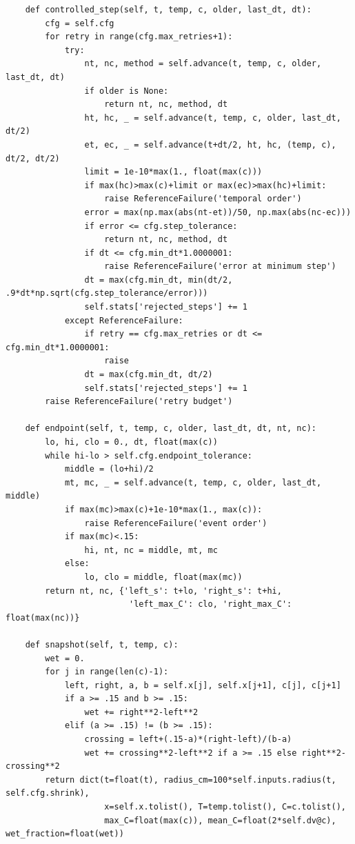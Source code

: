 \begin{verbatim}
    def controlled_step(self, t, temp, c, older, last_dt, dt):
        cfg = self.cfg
        for retry in range(cfg.max_retries+1):
            try:
                nt, nc, method = self.advance(t, temp, c, older, last_dt, dt)
                if older is None:
                    return nt, nc, method, dt
                ht, hc, _ = self.advance(t, temp, c, older, last_dt, dt/2)
                et, ec, _ = self.advance(t+dt/2, ht, hc, (temp, c), dt/2, dt/2)
                limit = 1e-10*max(1., float(max(c)))
                if max(hc)>max(c)+limit or max(ec)>max(hc)+limit:
                    raise ReferenceFailure('temporal order')
                error = max(np.max(abs(nt-et))/50, np.max(abs(nc-ec)))
                if error <= cfg.step_tolerance:
                    return nt, nc, method, dt
                if dt <= cfg.min_dt*1.0000001:
                    raise ReferenceFailure('error at minimum step')
                dt = max(cfg.min_dt, min(dt/2, .9*dt*np.sqrt(cfg.step_tolerance/error)))
                self.stats['rejected_steps'] += 1
            except ReferenceFailure:
                if retry == cfg.max_retries or dt <= cfg.min_dt*1.0000001:
                    raise
                dt = max(cfg.min_dt, dt/2)
                self.stats['rejected_steps'] += 1
        raise ReferenceFailure('retry budget')

    def endpoint(self, t, temp, c, older, last_dt, dt, nt, nc):
        lo, hi, clo = 0., dt, float(max(c))
        while hi-lo > self.cfg.endpoint_tolerance:
            middle = (lo+hi)/2
            mt, mc, _ = self.advance(t, temp, c, older, last_dt, middle)
            if max(mc)>max(c)+1e-10*max(1., max(c)):
                raise ReferenceFailure('event order')
            if max(mc)<.15:
                hi, nt, nc = middle, mt, mc
            else:
                lo, clo = middle, float(max(mc))
        return nt, nc, {'left_s': t+lo, 'right_s': t+hi,
                         'left_max_C': clo, 'right_max_C': float(max(nc))}

    def snapshot(self, t, temp, c):
        wet = 0.
        for j in range(len(c)-1):
            left, right, a, b = self.x[j], self.x[j+1], c[j], c[j+1]
            if a >= .15 and b >= .15:
                wet += right**2-left**2
            elif (a >= .15) != (b >= .15):
                crossing = left+(.15-a)*(right-left)/(b-a)
                wet += crossing**2-left**2 if a >= .15 else right**2-crossing**2
        return dict(t=float(t), radius_cm=100*self.inputs.radius(t, self.cfg.shrink),
                    x=self.x.tolist(), T=temp.tolist(), C=c.tolist(),
                    max_C=float(max(c)), mean_C=float(2*self.dv@c), wet_fraction=float(wet))


\end{verbatim}
